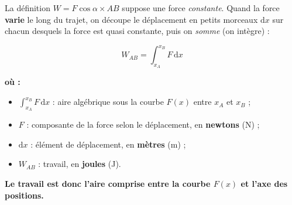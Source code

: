 \documentclass[11pt,a4paper]{article}
\newenvironment{ou}{%
  \par\smallskip\noindent\textbf{où :}\nopagebreak
  \begin{itemize}[leftmargin=1.8em,topsep=2pt,itemsep=1.5pt,parsep=0pt]}%
  {\end{itemize}}
\newcommand{\dd}{\mathrm{d}}
\begin{document}
La définition $W=F\cos\alpha\times AB$ suppose une force \emph{constante}. Quand la force
\textbf{varie} le long du trajet, on découpe le déplacement en petits morceaux $\dd x$ sur chacun
desquels la force est quasi constante, puis on \emph{somme} (on intègre) :

\begin{formule}
\[
\boxed{\;W_{AB}=\int_{x_A}^{x_B} F\,\dd x\;}
\]
\begin{ou}
  \item $\int_{x_A}^{x_B} F\,\dd x$ : aire algébrique sous la courbe $F(x)$ entre $x_A$ et $x_B$ ;
  \item $F$ : composante de la force selon le déplacement, en \textbf{newtons} (\si{\newton}) ;
  \item $\dd x$ : élément de déplacement, en \textbf{mètres} (\si{\metre}) ;
  \item $W_{AB}$ : travail, en \textbf{joules} (\si{\joule}).
\end{ou}
\textbf{Le travail est donc l'aire comprise entre la courbe $F(x)$ et l'axe des positions.}
\end{formule}
\end{document}

